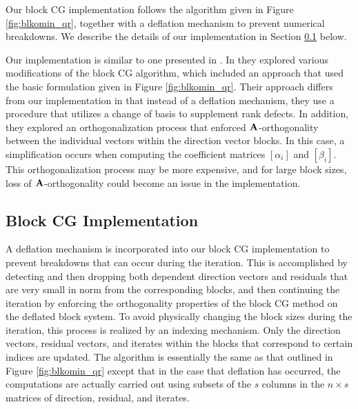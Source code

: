 \documentclass[twoside]{siamltex}
\newcommand{\bA}{{\bf A}}
\begin{document}
Our block CG implementation follows the algorithm given in Figure
\ref{fig:blkomin_qr}, together with a deflation mechanism to
prevent numerical breakdowns. We describe the details of our
implementation in Section \ref{sec:belosblkcg} below.

Our implementation is similar to one presented in \cite{DUB01}. In
\cite{DUB01} they explored various modifications of the block CG
algorithm, which included an approach that used the basic
formulation given in Figure \ref{fig:blkomin_qr}. Their approach
differs from our implementation in that instead of a deflation
mechanism, they use a procedure that utilizes a change of basis to
supplement rank defects. In addition, they explored an
orthogonalization process that enforced $\bA$-orthogonality
between the individual vectors within the direction vector blocks.
In this case, a simplification occurs when computing the
coefficient matrices $[\alpha_i]$ and $[\beta_i]$. This
orthogonalization process may be more expensive, and for large
block sizes, loss of $\bA$-orthogonality could become an issue in
the implementation.

\subsection{Block CG Implementation}
\label{sec:belosblkcg}

A deflation mechanism is incorporated into our block CG
implementation to prevent breakdowns that can occur during the
iteration. This is accomplished by detecting and then dropping
both dependent direction vectors and residuals that are very small
in norm from the corresponding blocks, and then continuing the
iteration by enforcing the orthogonality properties of the block
CG method on the deflated block system. To avoid physically
changing the block sizes during the iteration, this process is
realized by an indexing mechanism. Only the direction vectors,
residual vectors, and iterates within the blocks that correspond
to certain indices are updated. The algorithm is essentially the
same as that outlined in Figure \ref{fig:blkomin_qr} except that
in the case that deflation has occurred, the computations are
actually carried out using subsets of the $s$ columns in the $n
\times s$ matrices of direction, residual, and iterates.
\end{document}
